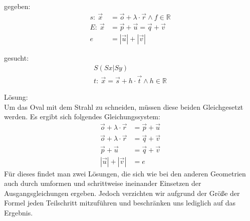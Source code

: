 \documentclass[reducespace,stylepage,semiarbeit]{spezidoc}
\begin{document}
gegeben:
\begin{subequations}
\begin{align}
s:~ \vec{x} &= \vec{o} + \lambda \cdot \vec{r} \wedge f \in \mathds{R}\\
E:~ \vec{x} &= \vec{p} + \vec{u} = \vec{q} + \vec{v} \\
e &= |\vec{u}| + |\vec{v}| \nonumber
\end{align}
\end{subequations}

gesucht:
\begin{subequations}
\begin{align}
S(Sx|Sy)~~~~~~ \\
t:~ \vec{x} = \vec{s} + h \cdot \vec{t} \wedge h \in \mathds{R}
\end{align}
\end{subequations}

Lösung: \\
Um das Oval mit dem Strahl zu schneiden, müssen diese beiden Gleichgesetzt werden. Es ergibt sich folgendes Gleichungssystem:
\begin{equation*}
\begin{split}
\vec{o} + \lambda \cdot \vec{r} &= \vec{p} + \vec{u} \\
\vec{o} + \lambda \cdot \vec{r} &= \vec{q} + \vec{v} \\
\vec{p} + \vec{u} &= \vec{q} + \vec{v} \\
|\vec{u}| + |\vec{v}| &= e
\end{split}
\end{equation*}
Für dieses findet man zwei Lösungen, die sich wie bei den anderen Geometrien auch durch umformen und schrittweise ineinander Einsetzen der Ausgangsgleichungen ergeben. Jedoch verzichten wir aufgrund der Größe der Formel jeden Teilschritt mitzuführen und beschränken uns lediglich auf das Ergebnis.
\end{document}
